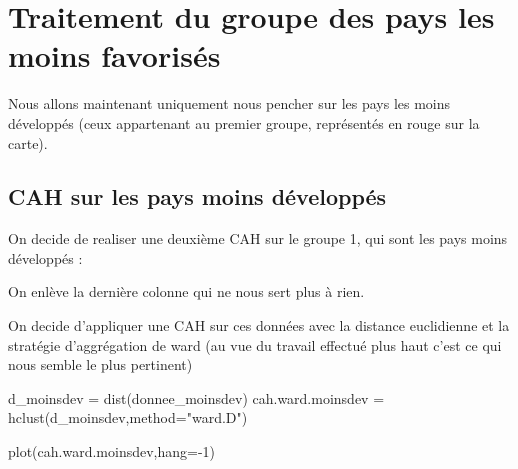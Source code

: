\documentclass[
]{article}
\newenvironment{Shaded}{}{}
\newcommand{\AttributeTok}[1]{#1}
\newcommand{\DecValTok}[1]{#1}
\newcommand{\FunctionTok}[1]{#1}
\newcommand{\NormalTok}[1]{#1}
\newcommand{\OtherTok}[1]{\textcolor[rgb]{1.00,0.25,0.00}{#1}}
\newcommand{\SpecialCharTok}[1]{\textcolor[rgb]{0.00,0.50,0.50}{#1}}
\newcommand{\StringTok}[1]{\textcolor[rgb]{0.00,0.50,0.50}{#1}}
\begin{document}
\hypertarget{traitement-du-groupe-des-pays-les-moins-favorisuxe9s}{%
\section{Traitement du groupe des pays les moins
favorisés}\label{traitement-du-groupe-des-pays-les-moins-favorisuxe9s}}

Nous allons maintenant uniquement nous pencher sur les pays les moins
développés (ceux appartenant au premier groupe, représentés en rouge sur
la carte).

\hypertarget{cah-sur-les-pays-moins-duxe9veloppuxe9s}{%
\subsection{CAH sur les pays moins
développés}\label{cah-sur-les-pays-moins-duxe9veloppuxe9s}}

On decide de realiser une deuxième CAH sur le groupe 1, qui sont les
pays moins développés :

\begin{Shaded}
\end{Shaded}

On enlève la dernière colonne qui ne nous sert plus à rien.

On decide d'appliquer une CAH sur ces données avec la distance
euclidienne et la stratégie d'aggrégation de ward (au vue du travail
effectué plus haut c'est ce qui nous semble le plus pertinent)

\begin{Shaded}
\begin{Highlighting}[]
\NormalTok{d\_moinsdev }\OtherTok{=} \FunctionTok{dist}\NormalTok{(donnee\_moinsdev)}
\NormalTok{cah.ward.moinsdev }\OtherTok{=} \FunctionTok{hclust}\NormalTok{(d\_moinsdev,}\AttributeTok{method=}\StringTok{"ward.D"}\NormalTok{)}

\FunctionTok{plot}\NormalTok{(cah.ward.moinsdev,}\AttributeTok{hang=}\SpecialCharTok{{-}}\DecValTok{1}\NormalTok{)}
\end{Highlighting}
\end{Shaded}
\end{document}
